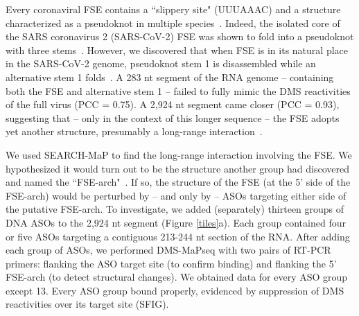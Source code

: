 \documentclass[main.tex]{subfiles}
\begin{document}
Every coronaviral FSE contains a ``slippery site" (UUUAAAC) and a structure characterized as a pseudoknot in multiple species~\cite{Brierley1989,Herald1993,Plant2005b}.
Indeed, the isolated core of the SARS coronavirus 2 (SARS-CoV-2) FSE was shown to fold into a pseudoknot with three stems~\cite{KZhang2021,Jones2022}.
However, we discovered that when FSE is in its natural place in the SARS-CoV-2 genome, pseudoknot stem 1 is disassembled while an alternative stem 1 folds~\cite{Lan2022}.
A 283 nt segment of the RNA genome -- containing both the FSE and alternative stem 1 -- failed to fully mimic the DMS reactivities of the full virus (PCC = 0.75).
A 2,924 nt segment came closer (PCC = 0.93), suggesting that -- only in the context of this longer sequence -- the FSE adopts yet another structure, presumably a long-range interaction~\cite{Lan2022}.

We used SEARCH-MaP to find the long-range interaction involving the FSE.
We hypothesized it would turn out to be the structure another group had discovered and named the ``FSE-arch"~\cite{Ziv2020}.
If so, the structure of the FSE (at the 5' side of the FSE-arch) would be perturbed by -- and only by -- ASOs targeting either side of the putative FSE-arch.
To investigate, we added (separately) thirteen groups of DNA ASOs to the 2,924 nt segment (Figure \ref{tiles}a).
Each group contained four or five ASOs targeting a contiguous 213-244 nt section of the RNA.
After adding each group of ASOs, we performed DMS-MaPseq with two pairs of RT-PCR primers: flanking the ASO target site (to confirm binding) and flanking the 5' FSE-arch (to detect structural changes).
We obtained data for every ASO group except 13.
Every ASO group bound properly, evidenced by suppression of DMS reactivities over its target site (SFIG).
\end{document}

